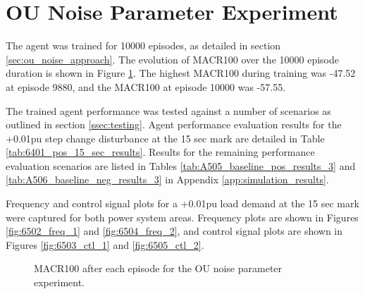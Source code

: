 \section{OU Noise Parameter Experiment}\label{sec:ou_noise}
The agent was trained for 10000 episodes, as detailed in section \ref{sec:ou_noise_approach}. The evolution of MACR100 over the 10000 episode duration is shown in Figure \ref{fig:6501_average_reward}. The highest MACR100 during training was -47.52 at episode 9880, and the MACR100 at episode 10000 was -57.55.

The trained agent performance was tested against a number of scenarios as outlined in section \ref{ssec:testing}. Agent performance evaluation results for the +0.01pu step change disturbance at the 15 sec mark are detailed in Table \ref{tab:6401_pos_15_sec_results}. Results for the remaining performance evaluation scenarios are listed in Tables \ref{tab:A505_baseline_pos_results_3} and \ref{tab:A506_baseline_neg_results_3} in Appendix \ref{app:simulation_results}.

Frequency and control signal plots for a +0.01pu load demand at the 15 sec mark were captured for both power system areas. Frequency plots are shown in Figures \ref{fig:6502_freq_1} and \ref{fig:6504_freq_2}, and control signal plots are shown in Figures \ref{fig:6503_ctl_1} and \ref{fig:6505_ctl_2}.

\begin{figure}[h]
	\centering
	
	\caption{MACR100 after each episode for the OU noise parameter experiment.}\label{fig:6501_average_reward}
\end{figure}



